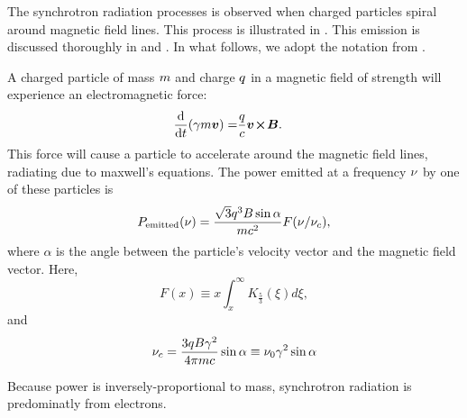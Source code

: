 The synchrotron radiation processes is observed when charged particles
spiral around magnetic field lines.  This process is illustrated in
.  This emission is discussed
thoroughly in \cite{blumenthal_1970a_bremsstrahlung-synchrotron} and
\cite{rybicki_1979a_radiative-processes}.  In what follows, we adopt
the notation from \cite{houck_2006a_models-nonthermal}.

A charged particle of mass $m$ and charge $q$ in a magnetic
field of strength \MagneticFieldVector will experience an electromagnetic
force:
\begin{align}
  \frac{\text{d}}{\text{d}t} (\gamma m \boldsymbol{v}) = & \frac{q}{c} \boldsymbol{v}\!\boldsymbol{\times}\!\boldsymbol{B}.
\end{align}
This force will cause a particle to accelerate around the magnetic field
lines, radiating due to maxwell's equations.  The power emitted at a
frequency $\nu$ by one of these particles is
\begin{equation}
  \eqnlabel{power_emitted_particle_sync}
  \power_\text{emitted}(\frequency) = 
  \frac{\sqrt{3} \charge^3 B \sin\alpha}{\mass \speedoflight^2} F(\frequency/\frequency_c),
\end{equation}
where $\alpha$ is the angle between the particle's velocity vector and
the magnetic field vector. Here,
\begin{equation}
  F(x) \equiv x \int_x^\infty K_{\tfrac{5}{3}} (\xi) d\xi,
\end{equation}
and
\begin{equation}
  \eqnlabel{characteristic_freqnecy_synctotron}
\frequency_c = \frac{3q \MagneticField \gamma^2}{4\pi \mass \speedoflight} 
\sin\alpha \equiv \nu_0 \gamma^2 \sin\alpha
\end{equation}

Because power is inversely-proportional to mass, synchrotron radiation
is predominatly from electrons.

